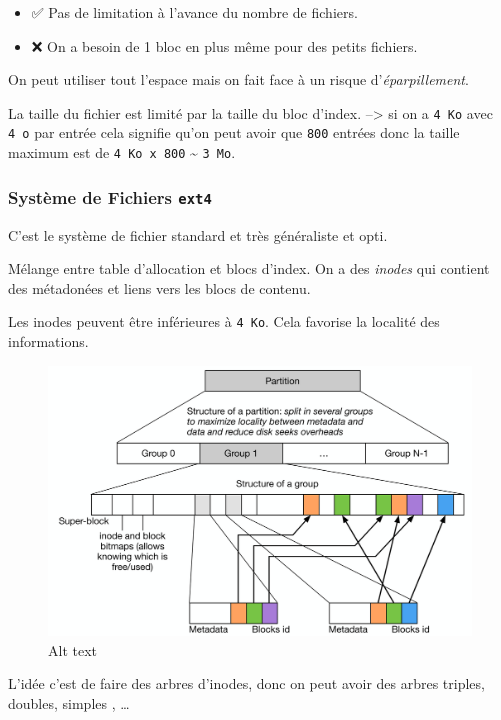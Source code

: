 \begin{itemize}
\tightlist
\item
  ✅ Pas de limitation à l'avance du nombre de fichiers.
\item
  ❌ On a besoin de 1 bloc en plus même pour des petits fichiers.
\end{itemize}

On peut utiliser tout l'espace mais on fait face à un risque
d'\emph{éparpillement}.

La taille du fichier est limité par la taille du bloc d'index.
--\textgreater{} si on a \texttt{4\ Ko} avec \texttt{4\ o} par entrée
cela signifie qu'on peut avoir que \texttt{800} entrées donc la taille
maximum est de \texttt{4\ Ko\ x\ 800} \textasciitilde{} \texttt{3\ Mo}.

\subsubsection{\texorpdfstring{Système de Fichiers
\texttt{ext4}}{Système de Fichiers ext4}}\label{systuxe8me-de-fichiers-ext4}

C'est le système de fichier standard et très généraliste et opti.

Mélange entre table d'allocation et blocs d'index. On a des
\emph{inodes} qui contient des métadonées et liens vers les blocs de
contenu.

Les inodes peuvent être inférieures à \texttt{4\ Ko}. Cela favorise la
localité des informations.

\begin{figure}
\centering
\includegraphics{image-44.png}
\caption{Alt text}
\end{figure}

L'idée c'est de faire des arbres d'inodes, donc on peut avoir des arbres
triples, doubles, simples , \ldots{}

